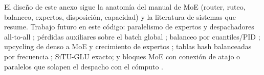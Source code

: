 El diseño de este anexo sigue la anatomía del manual de MoE (router, ruteo,
balanceo, expertos, disposición, capacidad) y la literatura de sistemas que
resume. Trabajo futuro en este código: paralelismo de expertos y despachadores
all-to-all \citep{lepikhin2020gshard,fedus2021switch}; pérdidas auxiliares sobre
el batch global \citep{qiu2025demons}; balanceo por cuantiles/PID
\citep{jin2026idbalancing}; upcycling de denso a MoE y crecimiento de expertos
\citep{komatsuzaki2023upcycling}; tablas hash balanceadas por frecuencia
\citep{roller2021hash}; SiTU-GLU exacto; y bloques MoE con conexión de atajo o
paralelos que solapen el despacho con el cómputo
\citep{cai2024scmoe,longcat2025flash}.
